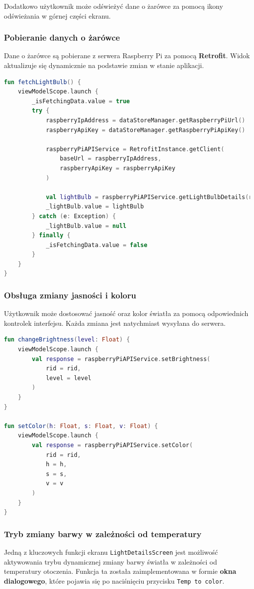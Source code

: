 \documentclass[12pt]{article}
\begin{document}
\noindent Dodatkowo użytkownik może odświeżyć dane o żarówce za pomocą ikony odświeżania w górnej części ekranu.

\subsubsection*{Pobieranie danych o żarówce}
\noindent Dane o żarówce są pobierane z serwera Raspberry Pi za pomocą \textbf{Retrofit}. Widok aktualizuje się dynamicznie na podstawie zmian w stanie aplikacji.

\begin{lstlisting}[language=Kotlin]
fun fetchLightBulb() {
    viewModelScope.launch {
        _isFetchingData.value = true
        try {
            raspberryIpAddress = dataStoreManager.getRaspberryPiUrl()
            raspberryApiKey = dataStoreManager.getRaspberryPiApiKey()

            raspberryPiAPIService = RetrofitInstance.getClient(
                baseUrl = raspberryIpAddress,
                raspberryApiKey = raspberryApiKey
            )

            val lightBulb = raspberryPiAPIService.getLightBulbDetails(rid).body()
            _lightBulb.value = lightBulb
        } catch (e: Exception) {
            _lightBulb.value = null
        } finally {
            _isFetchingData.value = false
        }
    }
}
\end{lstlisting}

\subsubsection*{Obsługa zmiany jasności i koloru}
\noindent Użytkownik może dostosować jasność oraz kolor światła za pomocą odpowiednich kontrolek interfejsu. Każda zmiana jest natychmiast wysyłana do serwera.

\begin{lstlisting}[language=Kotlin]
fun changeBrightness(level: Float) {
    viewModelScope.launch {
        val response = raspberryPiAPIService.setBrightness(
            rid = rid,
            level = level
        )
    }
}

fun setColor(h: Float, s: Float, v: Float) {
    viewModelScope.launch {
        val response = raspberryPiAPIService.setColor(
            rid = rid,
            h = h,
            s = s,
            v = v
        )
    }
}
\end{lstlisting}

\subsubsection*{Tryb zmiany barwy w zależności od temperatury}
\noindent Jedną z kluczowych funkcji ekranu \texttt{LightDetailsScreen} jest możliwość aktywowania trybu dynamicznej zmiany barwy światła w zależności od temperatury otoczenia. Funkcja ta została
zaimplementowana w formie \textbf{okna dialogowego}, które pojawia się po naciśnięciu przycisku \texttt{Temp to color}. 
\end{document}
